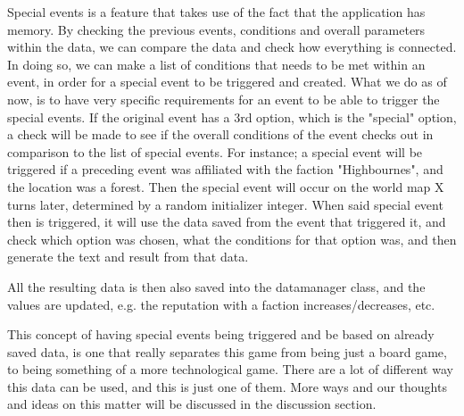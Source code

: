\documentclass[a4paper,11pt]{report}
\begin{document}
Special events is a feature that takes use of the fact that the application has memory. By checking the previous events, conditions and overall parameters within the data, we can compare the data and check how everything is connected. In doing so, we can make a list of conditions that needs to be met within an event, in order for a special event to be triggered and created. What we do as of now, is to have very specific requirements for an event to be able to trigger the special events. If the original event has a 3rd option, which is the "special" option, a check will be made to see if the overall conditions of the event checks out in comparison to the list of special events.
For instance; a special event will be triggered if a preceding event was affiliated with the faction "Highbournes", and the location was a forest. Then the special event will occur on the world map X turns later, determined by a random initializer integer. When said special event then is triggered, it will use the data saved from the event that triggered it, and check which option was chosen, what the conditions for that option was, and then generate the text and result from that data.

All the resulting data is then also saved into the datamanager class, and the values are updated, e.g. the reputation with a faction increases/decreases, etc.


This concept of having special events being triggered and be based on already saved data, is one that really separates this game from being just a board game, to being something of a more technological game. There are a lot of different way this data can be used, and this is just one of them. More ways and our thoughts and ideas on this matter will be discussed in the discussion section.
\end{document}
